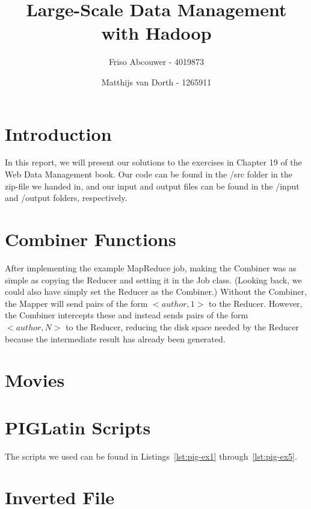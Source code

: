 \documentclass[11pt]{article}
\title{Large-Scale Data Management with Hadoop}
\author{Friso Abcouwer - 4019873 \and Matthijs van Dorth - 1265911}
\begin{document}
\maketitle

\section{Introduction}
In this report, we will present our solutions to the exercises in Chapter 19 of the Web Data Management book.
Our code can be found in the /src folder in the zip-file we handed in, and our input and output files can be found in the /input and /output folders, respectively.

\section{Combiner Functions}
After implementing the example MapReduce job, making the Combiner was as simple as copying the Reducer and setting it in the Job class. (Looking back, we could also have simply set the Reducer as the Combiner.)
Without the Combiner, the Mapper will send pairs of the form $<author, 1>$ to the Reducer. However, the Combiner intercepts these and instead sends pairs of the form $<author,N>$ to the Reducer, reducing the disk space needed by the Reducer because the intermediate result has already been generated.

\section{Movies}

\section{PIGLatin Scripts}
The scripts we used can be found in Listings~\ref{lst:pig-ex1} through~\ref{lst:pig-ex5}.






\section{Inverted File}
\end{document}

